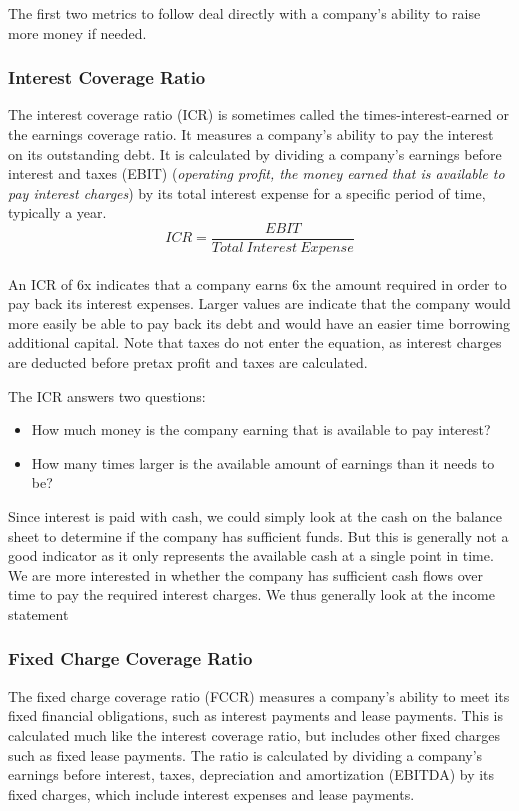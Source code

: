 \documentclass{article}
\begin{document}
The first two metrics to follow deal directly with a company's ability to raise more money if needed. 

\subsubsection{Interest Coverage Ratio}
The interest coverage ratio (ICR) is sometimes called the times-interest-earned or the earnings coverage ratio. It measures a company's ability to pay the interest on its outstanding debt. It is calculated by dividing a company's earnings before interest and taxes (EBIT) (\textit{operating profit, the money earned that is available to pay interest charges}) by its total interest expense for a specific period of time, typically a year. \\

 \begin{equation}
    ICR = \frac{EBIT}{Total\: Interest\: Expense}
\end{equation}\\

An ICR of 6x indicates that a company earns 6x the amount required in order to pay back its interest expenses. Larger values are indicate that the company would more easily be able to pay back its debt and would have an easier time borrowing additional capital. Note that taxes do not enter the equation, as interest charges are deducted before pretax profit and taxes are calculated. 

The ICR answers two questions:
\begin{itemize}
\item How much money is the company earning that is available to pay interest?
\item How many times larger is the available amount of earnings than it needs to be?
\end{itemize}

Since interest is paid with cash, we could simply look at the cash on the balance sheet to determine if the company has sufficient funds. But this is generally not a good indicator as it only represents the available cash at a single point in time. We are more interested in whether the company has sufficient cash flows over time to pay the required interest charges. We thus generally look at the income statement


\subsubsection{Fixed Charge Coverage Ratio}
The fixed charge coverage ratio (FCCR) measures a company's ability to meet its fixed financial obligations, such as interest payments and lease payments. This is calculated much like the interest coverage ratio, but includes other fixed charges such as fixed lease payments. The ratio is calculated by dividing a company's earnings before interest, taxes, depreciation and amortization (EBITDA) by its fixed charges, which include interest expenses and lease payments.
\end{document}

